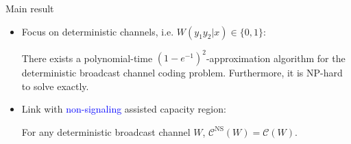\documentclass{beamer}
\theoremstyle{definition}
\theoremstyle{remark}
\begin{document}
\begin{frame}{Main result}
  \begin{itemize}
    \item Focus on \alert{deterministic} channels, i.e. $W(y_1y_2|x) \in \{0,1\}$:
  \begin{theorem} 
  There exists a polynomial-time $(1-e^{-1})^2$-approximation algorithm for the deterministic broadcast channel coding problem. Furthermore, it is \textrm{NP}-hard to solve exactly.
  \end{theorem}
  \pause
  \bigskip
\item Link with \textcolor{blue}{non-signaling} assisted capacity region:
  \begin{corollary}
  For any deterministic broadcast channel $W$, $\mathcal{C}^{\mathrm{NS}}(W)=\mathcal{C}(W)$.
  \end{corollary}
  \end{itemize}
\end{frame}
\end{document}
